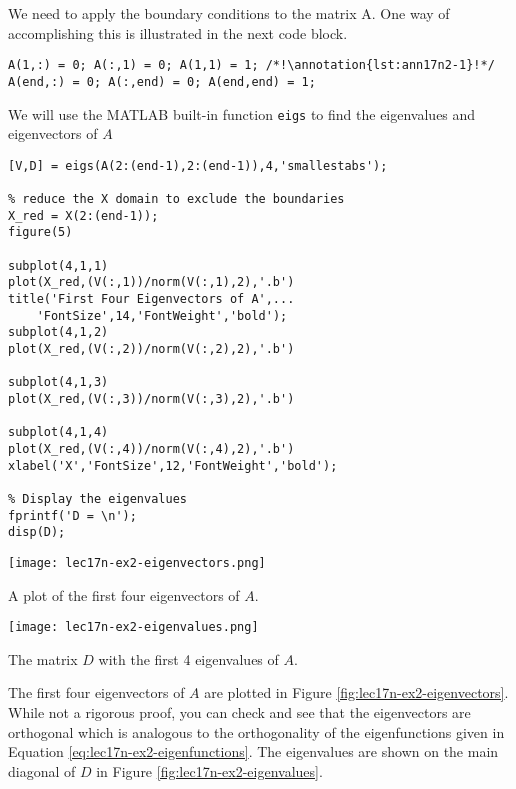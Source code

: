 We need to apply the boundary conditions to the matrix A.  One way of accomplishing this is illustrated in the next code block.
\begin{lstlisting}[style=myMatlab,name=lec17n-ex2]
% Set boundary conditions 
A(1,:) = 0; A(:,1) = 0; A(1,1) = 1; /*!\annotation{lst:ann17n2-1}!*/
A(end,:) = 0; A(:,end) = 0; A(end,end) = 1;
\end{lstlisting}

We will use the MATLAB built-in function \lstinline[style=myMatlab]{eigs} to find the eigenvalues and eigenvectors of $A$ 

\begin{lstlisting}[style=myMatlab,name=lec17n-ex2]
%  Get the four smallest eigenvalues and eigenvectors of A
[V,D] = eigs(A(2:(end-1),2:(end-1)),4,'smallestabs');

% reduce the X domain to exclude the boundaries
X_red = X(2:(end-1));
figure(5)

subplot(4,1,1)
plot(X_red,(V(:,1))/norm(V(:,1),2),'.b')
title('First Four Eigenvectors of A',...
    'FontSize',14,'FontWeight','bold');
subplot(4,1,2)
plot(X_red,(V(:,2))/norm(V(:,2),2),'.b')

subplot(4,1,3)
plot(X_red,(V(:,3))/norm(V(:,3),2),'.b')

subplot(4,1,4)
plot(X_red,(V(:,4))/norm(V(:,4),2),'.b')
xlabel('X','FontSize',12,'FontWeight','bold');

% Display the eigenvalues
fprintf('D = \n');
disp(D);
\end{lstlisting}
\begin{marginfigure}
\texttt{[image: lec17n-ex2-eigenvectors.png]}
\caption{A plot of the first four eigenvectors of $A$.}
\label{fig:lec17n-ex2-eigenvectors}
\end{marginfigure}
\begin{marginfigure}
\texttt{[image: lec17n-ex2-eigenvalues.png]}
\caption{The matrix $D$ with the first 4 eigenvalues of $A$.}
\label{fig:lec17n-ex2-eigenvalues}
\end{marginfigure}
The first four eigenvectors of $A$ are plotted in Figure \ref{fig:lec17n-ex2-eigenvectors}. While not a rigorous proof, you can check and see that the eigenvectors are orthogonal which is analogous to the orthogonality of the eigenfunctions given in Equation \ref{eq:lec17n-ex2-eigenfunctions}. The eigenvalues are shown on the main diagonal of $D$ in Figure \ref{fig:lec17n-ex2-eigenvalues}.

